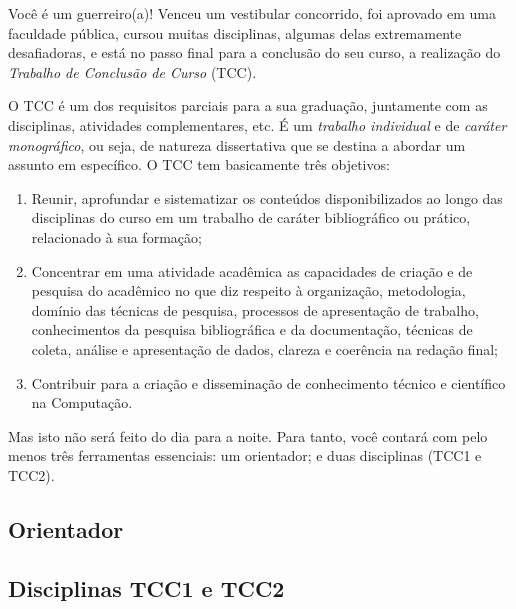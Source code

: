 Você é um guerreiro(a)! Venceu um vestibular concorrido, foi aprovado em uma faculdade pública, cursou muitas disciplinas, algumas delas extremamente desafiadoras, e está no passo final para a conclusão do seu curso, a realização do \emph{Trabalho de Conclusão de Curso} (TCC).

O TCC é um dos requisitos parciais para a sua graduação, juntamente com as disciplinas, atividades complementares, etc. É um \emph{trabalho individual} e de \emph{caráter monográfico}, ou seja, de natureza dissertativa que se destina a abordar um assunto em específico. O TCC tem basicamente três objetivos:

\begin{enumerate}
  \item Reunir, aprofundar e sistematizar os conteúdos disponibilizados ao longo das disciplinas do curso em um trabalho de caráter bibliográfico ou prático, relacionado à sua formação;
  \item Concentrar em uma atividade acadêmica as capacidades de criação e de pesquisa do acadêmico no que diz respeito à organização, metodologia, domínio das técnicas de pesquisa, processos de apresentação de trabalho, conhecimentos da pesquisa bibliográfica e da documentação, técnicas de coleta, análise e apresentação de dados, clareza e coerência na redação final;
  \item Contribuir para a criação e disseminação de conhecimento técnico e científico na Computação.
\end{enumerate}

Mas isto não será feito do dia para a noite. Para tanto, você contará com pelo menos três ferramentas essenciais: um orientador; e duas disciplinas (TCC1 e TCC2).

\subsection{Orientador}

\subsection{Disciplinas TCC1 e TCC2}
